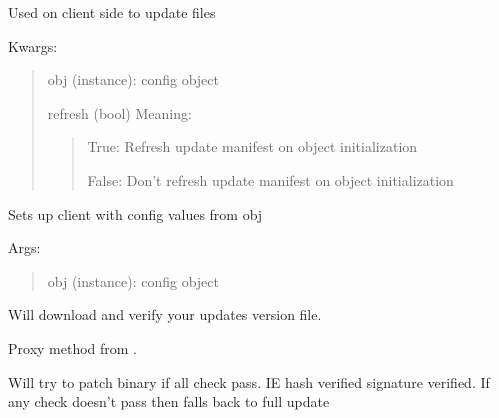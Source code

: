 \documentclass[letterpaper,10pt,english]{sphinxmanual}
\begin{document}
\begin{fulllineitems}
\label{api:pyi_updater.client.Client}
Used on client side to update files

Kwargs:
\begin{quote}

obj (instance): config object

refresh (bool) Meaning:
\begin{quote}

True: Refresh update manifest on object initialization

False: Don't refresh update manifest on object initialization
\end{quote}
\end{quote}

\begin{fulllineitems}
\label{api:pyi_updater.client.Client.init_app}
Sets up client with config values from obj

Args:
\begin{quote}

obj (instance): config object
\end{quote}

\end{fulllineitems}


\begin{fulllineitems}
\label{api:pyi_updater.client.Client.refresh}
Will download and verify your updates version file.

Proxy method from .

\end{fulllineitems}


\begin{fulllineitems}
\label{api:pyi_updater.client.Client.update_check}
Will try to patch binary if all check pass.  IE hash verified
signature verified.  If any check doesn't pass then falls back to
full update


\end{fulllineitems}
\end{fulllineitems}
\end{document}
